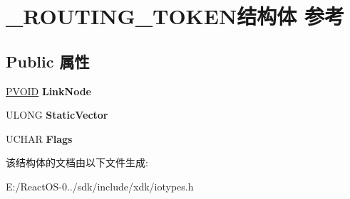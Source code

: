 \hypertarget{struct___r_o_u_t_i_n_g___t_o_k_e_n}{}\section{\+\_\+\+R\+O\+U\+T\+I\+N\+G\+\_\+\+T\+O\+K\+E\+N结构体 参考}
\label{struct___r_o_u_t_i_n_g___t_o_k_e_n}
\subsection*{Public 属性}
\begin{DoxyCompactItemize}
\item 
\mbox{\label{struct___r_o_u_t_i_n_g___t_o_k_e_n_a9d2b41bde42e8b340610a7c233078610}} 
\hyperlink{interfacevoid}{P\+V\+O\+ID} {\bfseries Link\+Node}
\item 
\mbox{\label{struct___r_o_u_t_i_n_g___t_o_k_e_n_ac0038dcfd6135663084d16a283f366c1}} 
U\+L\+O\+NG {\bfseries Static\+Vector}
\item 
\mbox{\label{struct___r_o_u_t_i_n_g___t_o_k_e_n_a710cd68ff261fb581b6795debb8d66c7}} 
U\+C\+H\+AR {\bfseries Flags}
\end{DoxyCompactItemize}


该结构体的文档由以下文件生成\+:\begin{DoxyCompactItemize}
\item 
E\+:/\+React\+O\+S-\/0../sdk/include/xdk/iotypes.\+h\end{DoxyCompactItemize}

